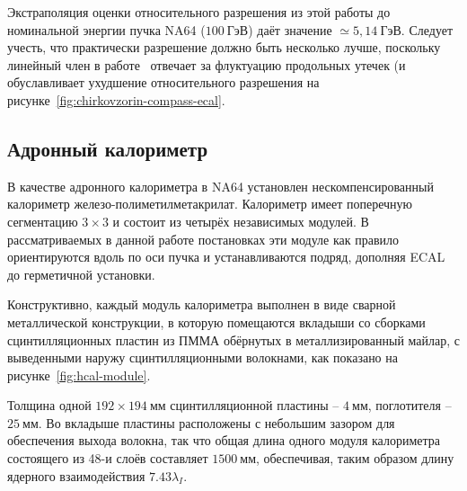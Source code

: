 Экстраполяция оценки относительного разрешения из этой работы до номинальной
энергии пучка NA64 ($100~\text{ГэВ}$) даёт значение $\simeq 5{,}14~\text{ГэВ}$.
Следует учесть, что практически разрешение должно быть несколько лучше,
поскольку линейный член в работе~\cite{chirkovzorin-compass-ecal}
отвечает за флуктуацию продольных утечек (и обуславливает ухудшение
относительного разрешения на рисунке~\ref{fig:chirkovzorin-compass-ecal}.




\subsection{Адронный калориметр}

В качестве адронного калориметра в NA64 установлен
нескомпенсированный калориметр железо-полиметилметакрилат.
Калориметр имеет поперечную сегментацию $3\times3$
и состоит из четырёх независимых модулей. В рассматриваемых
в данной работе постановках эти модуле как правило ориентируются
вдоль по оси пучка и устанавливаются подряд, дополняя ECAL до
герметичной установки.

Конструктивно, каждый модуль калориметра выполнен в виде
сварной металлической конструкции, в которую помещаются
вкладыши со сборками сцинтилляционных пластин из ПММА обёрнутых
в металлизированный майлар, с выведенными наружу
сцинтилляционными волокнами, как показано на рисунке~\ref{fig:hcal-module}.

Толщина одной $192\times194~\text{мм}$ сцинтилляционной
пластины -- $4~\text{мм}$, поглотителя -- $25~\text{мм}$.
Во вкладыше пластины расположены с небольшим зазором для обеспечения
выхода волокна, так что общая длина одного модуля калориметра
состоящего из 48-и слоёв составляет $1500~\text{мм}$, обеспечивая,
таким образом длину ядерного взаимодействия $7.43 \lambda_I$.

